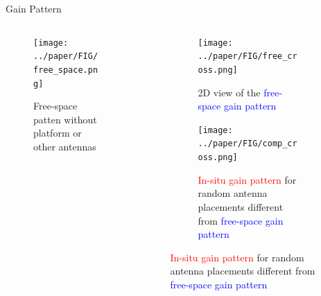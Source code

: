 \documentclass{beamer}
\begin{document}
\begin{frame}{Gain Pattern}
    \begin{columns}
        \begin{column}{0.5\linewidth}
            \begin{figure}
                \vspace{-2.5cm}
                \centering
                \texttt{[image: ../paper/FIG/free\_space.png]}
                \caption*{\tiny Free-space patten without platform or other antennas}
            \end{figure}
        \end{column}
        \begin{column}{0.5\linewidth}
            \begin{overlayarea}{\textwidth}{\textheight}
                \begin{figure}
                    \begin{subfigure}{\columnwidth}
                        \centering
                        \texttt{[image: ../paper/FIG/free\_cross.png]}
                        \caption*{\tiny {2D view of the \textcolor{blue}{free-space gain pattern}}}%
                    \end{subfigure}\vspace*{2mm}
                    \begin{subfigure}{\columnwidth}
                        \centering
                        \texttt{[image: ../paper/FIG/comp\_cross.png]}
                        \caption*{\tiny {\textcolor{red}{In-situ gain pattern} for random antenna placements different from \textcolor{blue}{free-space gain pattern}}}%
                    \end{subfigure}
                \end{figure}
            \end{overlayarea}
        \end{column}
    \end{columns}
\end{frame}
\end{document}
